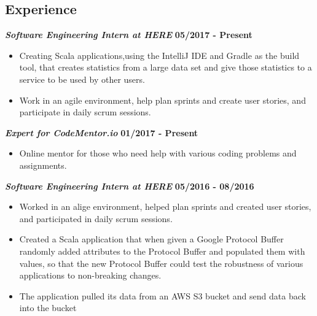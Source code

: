 \documentclass[margin=1in, 10pt]{res}
\begin{document}
\begin{resume}
\section{Experience}
	\textbf{\textit{Software Engineering Intern at HERE}}
	\hfill{\bf 05/2017 - Present}
	\begin{itemize}
		\item Creating Scala applications,using the IntelliJ IDE and Gradle as the build tool, that creates statistics from a large data set and give those statistics to a service to be used by other users. 
\item Work in an agile environment, help plan sprints and create user stories, and participate in daily scrum sessions. 
	\end{itemize}
\textbf{\textit{Expert for CodeMentor.io}}
	\hfill{\bf 01/2017 - Present}
	\begin{itemize}
		\item Online mentor for those who need help with various coding problems and assignments. 
	\end{itemize}
	\textbf{\textit{Software Engineering Intern at HERE}}
	\hfill {\bf 05/2016 - 08/2016}
	\begin{itemize}
	    \setlength\itemsep{0em}
	\item Worked in an alige environment, helped plan sprints and created user stories, and participated in daily scrum sessions. 
	  \item Created a Scala application
that when given a Google Protocol Buffer randomly added attributes to the Protocol Buffer 
 and populated them with values, so that the new Protocol Buffer could test the robustness of various applications to non-breaking changes.%
	\item The application pulled its data from an AWS S3 bucket and send data back into the bucket
	\end{itemize}  
	

\end{resume}
\end{document}
